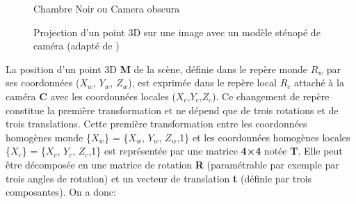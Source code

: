   \begin{figure}[H]%
  	\center%
  	\setlength{\fboxsep}{5pt}%
  	\setlength{\fboxrule}{0.5pt}%
  		\caption[Chambre Noir]{Chambre Noir ou Camera obscura}
  	\label{fig:Chambre Noir}
  \end{figure}
  
   \begin{figure}[H]%
  	\center%
  	\setlength{\fboxsep}{5pt}%
  	\setlength{\fboxrule}{0.5pt}%
  	\caption[Représentation du modèl sténopé]{Projection d’un point 3D sur une image avec un modèle sténopé de caméra (adapté de \cite{eikosim_etalonnage_2021})}
    \label{fig:Représentation du modèl sténopé}
  \end{figure}
  
 
 La position d’un point 3D \textbf{M} de la scène, définie dans le repère monde $R_w$ par ses coordonnées ($X_w$, $Y_w$, $Z_w$), est exprimée dans le repère local $R_c$ attaché à la caméra \textbf{C} avec les coordonnées locales ($X_c$,$Y_c$,$Z_c$). Ce changement de repère constitue la première transformation et ne dépend que de trois rotations et de trois translations. Cette première transformation entre les coordonnées homogènes monde \{$X_w$\} = \{$X_w$, $Y_w$, $Z_w$,1\} et les coordonnées homogènes locales \{$X_c$\} = \{$X_c$, $Y_c$, $Z_c$,1\} est représentée par une matrice \textbf{4×4} notée \textbf{T}. Elle peut être décomposée en une matrice de rotation \textbf{R} (paramétrable par exemple par trois angles de rotation) et un vecteur de translation \textbf{t} (définie par trois composantes). On a donc:
 
